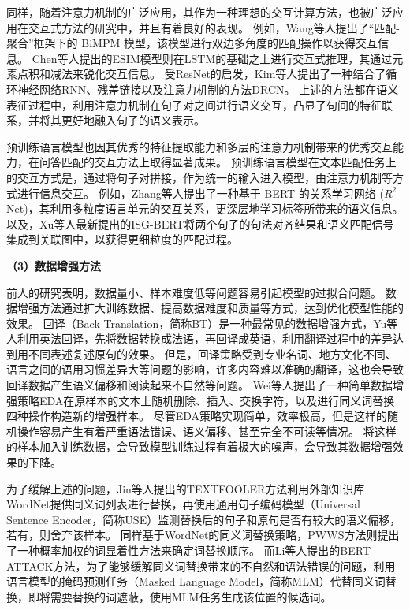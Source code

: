 同样，随着注意力机制的广泛应用，其作为一种理想的交互计算方法，也被广泛应用在交互式方法的研究中，并且有着良好的表现。
例如，Wang等人提出了“匹配-聚合”框架下的 BiMPM 模型\cite{wang2017bilateral}，该模型进行双边多角度的匹配操作以获得交互信息。 
Chen等人提出的ESIM\cite{chen-etal-2017-enhanced}模型则在LSTM的基础之上进行交互式推理，其通过元素点积和减法来锐化交互信息。
受ResNet\cite{he2016deep}的启发，Kim等人提出了一种结合了循环神经网络RNN、残差链接以及注意力机制的方法DRCN\cite{kim2019semantic}。
上述的方法都在语义表征过程中，利用注意力机制在句子对之间进行语义交互，凸显了句间的特征联系，并将其更好地融入句子的语义表示。

预训练语言模型也因其优秀的特征提取能力和多层的注意力机制带来的优秀交互能力，在问答匹配的交互方法上取得显著成果。
预训练语言模型在文本匹配任务上的交互方式是，通过将句子对拼接，作为统一的输入进入模型，由注意力机制等方式进行信息交互。
例如，Zhang等人提出了一种基于 BERT 的关系学习网络 ($R^2$-Net)\cite{zhang2021making}，其利用多粒度语言单元的交互关系，更深层地学习标签所带来的语义信息。
以及，Xu等人最新提出的ISG-BERT\cite{xu2022semantic}将两个句子的句法对齐结果和语义匹配信号集成到关联图中，以获得更细粒度的匹配过程。

\textbf{\songti （3）数据增强方法}

前人的研究表明，数据量小、样本难度低等问题容易引起模型的过拟合问题。
数据增强方法通过扩大训练数据、提高数据难度和质量等方式，达到优化模型性能的效果。
回译（Back Translation，简称BT）是一种最常见的数据增强方式，Yu等人\cite{yu2018qanet}利用英法回译，先将数据转换成法语，再回译成英语，利用翻译过程中的差异达到用不同表述复述原句的效果。
但是，回译策略受到专业名词、地方文化不同、语言之间的语用习惯差异大等问题的影响，许多内容难以准确的翻译，这也会导致回译数据产生语义偏移和阅读起来不自然等问题。
Wei等人提出了一种简单数据增强策略EDA\cite{wei2019eda}在原样本的文本上随机删除、插入、交换字符，以及进行同义词替换四种操作构造新的增强样本。
尽管EDA策略实现简单，效率极高，但是这样的随机操作容易产生有着严重语法错误、语义偏移、甚至完全不可读等情况。
将这样的样本加入训练数据，会导致模型训练过程有着极大的噪声，会导致其数据增强效果的下降。

为了缓解上述的问题，Jin等人提出的TEXTFOOLER\cite{jin2020bert}方法利用外部知识库WordNet\cite{miller1995wordnet}提供同义词列表进行替换，再使用通用句子编码模型（Universal Sentence Encoder，简称USE）\cite{cer2018universal}监测替换后的句子和原句是否有较大的语义偏移，若有，则舍弃该样本。
同样基于WordNet的同义词替换策略，PWWS方法\cite{ren-etal-2019-generating}则提出了一种概率加权的词显着性方法来确定词替换顺序。
而Li等人提出的BERT-ATTACK\cite{li2020bert}方法，为了能够缓解同义词替换带来的不自然和语法错误的问题，利用语言模型的掩码预测任务（Masked Language Model，简称MLM）代替同义词替换，即将需要替换的词遮蔽，使用MLM任务生成该位置的候选词。

